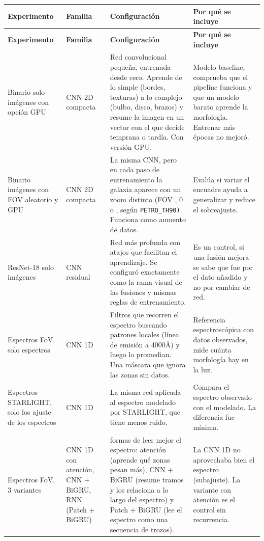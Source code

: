 \documentclass[12pt]{article}
\begin{document}
\begin{longtable}{|>{\raggedright\arraybackslash}p{}|>{\raggedright\arraybackslash}p{}|>{\raggedright\arraybackslash}p{}|>{\raggedright\arraybackslash}p{}|}
\hline \textbf{Experimento} & \textbf{Familia} & \textbf{Configuración} & \textbf{Por qué se incluye} \\ \hline \endfirsthead
\hline \textbf{Experimento} & \textbf{Familia} & \textbf{Configuración} & \textbf{Por qué se incluye} \\ \hline \endhead

Binario solo imágenes con opción GPU &
CNN 2D compacta &
Red convolucional pequeña, entrenada desde cero. Aprende de lo simple (bordes, texturas) a lo complejo (bulbo, disco, brazos) y resume la imagen en un vector con el que decide temprana o tardía. Con versión GPU.  &
Modelo baseline, comprueba que el pipeline funciona y que un modelo barato aprende la morfología. Entrenar más épocas no mejoró. \\ \hline

Binario imágenes con FOV aleatorio y GPU &
CNN 2D compacta  &
La misma CNN, pero en cada paso de entrenamiento la galaxia aparece con un zoom distinto (FOV \textminus1, 0 o \textpm1, según \texttt{PETRO\_TH90)}. Funciona como aumento de datos. &
Evalúa si variar el encuadre ayuda a generalizar y reduce el sobreajuste. \\ \hline

ResNet-18 solo imágenes &
CNN residual  &
Red más profunda con atajos que facilitan el aprendizaje. Se configuró exactamente como la rama visual de las fusiones y mismas reglas de entrenamiento.  &
Es un control, si una fusión mejora se sabe que fue por el dato añadido y no por cambiar de red. \\ \hline

Espectros FoV, solo espectros &
CNN 1D &
Filtros que recorren el espectro buscando patrones locales (línea de emisión a 4000Å) y luego lo promedian. Una máscara que ignora las zonas sin datos.  &
Referencia espectroscópica con datos observados, mide cuánta morfología hay en la luz. \\ \hline

Espectros STARLIGHT, solo los ajuste de los espectros &
CNN 1D &
La misma red aplicada al espectro modelado por STARLIGHT, que tiene menos ruido. &
Compara el espectro observado con el modelado. La diferencia fue mínima. \\ \hline

Espectros FoV, 3 variantes &
CNN 1D con atención, CNN + BiGRU, RNN (Patch + BiGRU) &
3 formas de leer mejor el espectro: atención (aprende qué zonas pesan más), CNN + BiGRU (resume tramos y los relaciona a lo largo del espectro) y Patch + BiGRU (lee el espectro como una secuencia de trozos). &
La CNN 1D no aprovechaba bien el espectro (subajuste). La variante con atención es el control sin recurrencia. \\ \hline


\end{longtable}
\end{document}
